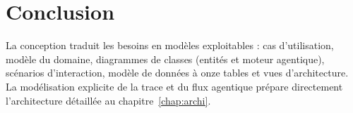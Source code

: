 \section{Conclusion}
La conception traduit les besoins en modèles exploitables : cas d'utilisation,
modèle du domaine, diagrammes de classes (entités et moteur agentique), scénarios
d'interaction, modèle de données à onze tables et vues d'architecture. La
modélisation explicite de la trace et du flux agentique prépare directement
l'architecture détaillée au chapitre~\ref{chap:archi}.
